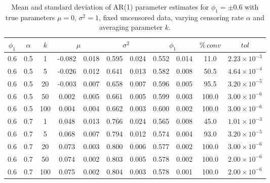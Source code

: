 \documentclass[10pt,twoside]{article}
\numberwithin{equation}{section}
\begin{document}
\begin{table}[htbp]

\begin{center}

\small

\caption{Mean and standard deviation of AR(1) parameter estimates for $\phi_1 = \pm0.6$ with true parameters $\mu=0$, $\sigma^2=1$, fixed uncensored data, varying censoring rate $\alpha$ and averaging parameter $k$.}

\label{tab:fixedAR12}

\begin{tabular}{|c|c|c|cc|cc|cc|c|c|}

\hline

$\phi_1$ & $\alpha$ & $k$ & \multicolumn{2}{c|}{$\mu$} & \multicolumn{2}{c|}{$\sigma^2$} & \multicolumn{2}{c|}{$\phi_1$} & $\%\,conv$ & $tol$ \\ \hline

0.6 & 0.5 & 1 & -0.082 & 0.018 & 0.595 & 0.024 & 0.552 & 0.014 & 11.0 & $2.23\times10^{-3}$ \\

0.6 & 0.5 & 5 & -0.026 & 0.012 & 0.641 & 0.013 & 0.582 & 0.008 & 50.5 & $4.64\times10^{-4}$ \\

0.6 & 0.5 & 20 & -0.003 & 0.007 & 0.658 & 0.007 & 0.596 & 0.005 & 95.5 & $3.20\times10^{-5}$ \\

0.6 & 0.5 & 50 & 0.002 & 0.005 & 0.661 & 0.005 & 0.599 & 0.003 & 100.0 & $3.00\times10^{-6}$ \\

0.6 & 0.5 & 100 & 0.004 & 0.004 & 0.662 & 0.003 & 0.600 & 0.002 & 100.0 & $3.00\times10^{-6}$ \\ \hline

0.6 & 0.7 & 1 & 0.048 & 0.013 & 0.766 & 0.024 & 0.565 & 0.008 & 45.0 & $1.01\times10^{-3}$ \\

0.6 & 0.7 & 5 & 0.068 & 0.007 & 0.794 & 0.012 & 0.574 & 0.004 & 93.0 & $3.20\times10^{-5}$ \\

0.6 & 0.7 & 20 & 0.073 & 0.003 & 0.800 & 0.006 & 0.577 & 0.002 & 100.0 & $3.00\times10^{-6}$ \\

0.6 & 0.7 & 50 & 0.074 & 0.002 & 0.803 & 0.005 & 0.578 & 0.002 & 100.0 & $2.00\times10^{-6}$ \\

0.6 & 0.7 & 100 & 0.075 & 0.002 & 0.804 & 0.003 & 0.578 & 0.001 & 100.0 & $2.00\times10^{-6}$ \\ \hline


\end{tabular}
\end{center}
\end{table}
\end{document}

